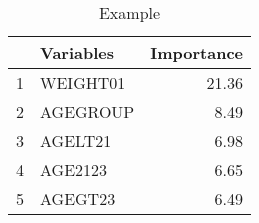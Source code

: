 \begin{table}[ht]
\centering
\begin{tabular}{rlr}
  \toprule
 & Variables & Importance \\ 
  \midrule
1 & WEIGHT01 & 21.36 \\ 
  2 & AGEGROUP & 8.49 \\ 
  3 & AGELT21 & 6.98 \\ 
  4 & AGE2123 & 6.65 \\ 
  5 & AGEGT23 & 6.49 \\ 
   \bottomrule
\end{tabular}
\caption{Example} 
\end{table}
